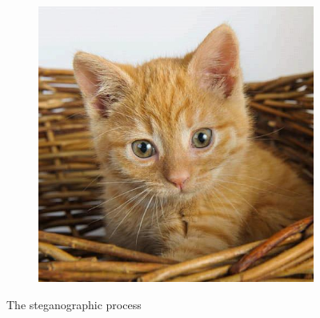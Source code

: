 \begin{figure}[]
	\begin{subfigure}[b]{.4\linewidth}
		\includegraphics[width=.97\textwidth]{sections/pictures/encrypted.jpg}
		\label{img3}
	\end{subfigure}
	\caption{The steganographic process}\label{LSBDemo}
\end{figure} 
